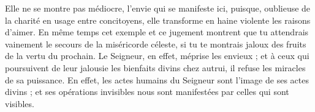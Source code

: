 Elle ne se montre pas médiocre, l’envie qui se manifeste ici, puisque, oublieuse de la charité en usage entre concitoyens, elle transforme en haine violente les raisons d’aimer. En même temps cet exemple et ce jugement montrent que tu attendrais vainement le secours de la miséricorde céleste, si tu te montrais jaloux des fruits de la vertu du prochain. Le Seigneur, en effet, méprise les envieux ; et à ceux qui poursuivent de leur jalousie les bienfaits divins chez autrui, il refuse les miracles de sa puissance. En effet, les actes humains du Seigneur sont l’image de ses actes divins ; et ses opérations invisibles nous sont manifestées par celles qui sont visibles.
